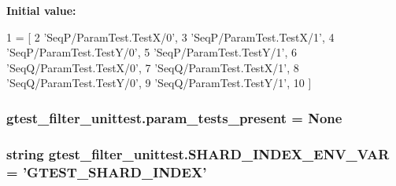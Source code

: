 {\bfseries Initial value\-:}
\begin{DoxyCode}
1 = [
2     \textcolor{stringliteral}{'SeqP/ParamTest.TestX/0'},
3     \textcolor{stringliteral}{'SeqP/ParamTest.TestX/1'},
4     \textcolor{stringliteral}{'SeqP/ParamTest.TestY/0'},
5     \textcolor{stringliteral}{'SeqP/ParamTest.TestY/1'},
6     \textcolor{stringliteral}{'SeqQ/ParamTest.TestX/0'},
7     \textcolor{stringliteral}{'SeqQ/ParamTest.TestX/1'},
8     \textcolor{stringliteral}{'SeqQ/ParamTest.TestY/0'},
9     \textcolor{stringliteral}{'SeqQ/ParamTest.TestY/1'},
10     ]
\end{DoxyCode}
\hypertarget{namespacegtest__filter__unittest_aab31f58fd88fa64c14e6ab5dc5fb8da3}{
\subsubsection[{param\-\_\-tests\-\_\-present}]{\setlength{\rightskip}{0pt plus 5cm}gtest\-\_\-filter\-\_\-unittest.\-param\-\_\-tests\-\_\-present = {\bf None}}}\label{namespacegtest__filter__unittest_aab31f58fd88fa64c14e6ab5dc5fb8da3}
\hypertarget{namespacegtest__filter__unittest_a082d5120f29f56d497db94401d773ca7}{
\subsubsection[{S\-H\-A\-R\-D\-\_\-\-I\-N\-D\-E\-X\-\_\-\-E\-N\-V\-\_\-\-V\-A\-R}]{\setlength{\rightskip}{0pt plus 5cm}string gtest\-\_\-filter\-\_\-unittest.\-S\-H\-A\-R\-D\-\_\-\-I\-N\-D\-E\-X\-\_\-\-E\-N\-V\-\_\-\-V\-A\-R = 'G\-T\-E\-S\-T\-\_\-\-S\-H\-A\-R\-D\-\_\-\-I\-N\-D\-E\-X'}}\label{namespacegtest__filter__unittest_a082d5120f29f56d497db94401d773ca7}
